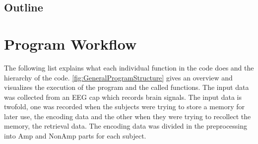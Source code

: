 \documentclass[12pt, a4paper]{article}
\begin{document}
\subsection{Outline}

\section{Program Workflow}

The following list explains what each individual function in the code does and the hierarchy of the code.
\cref{fig:GeneralProgramStructure} gives an overview and visualizes the execution of the program and the called functions.
The input data was collected from an EEG cap which records brain signals.
The input data is twofold, one was recorded when the subjects were trying to store a memory for later use, the encoding data and the other when they were trying to recollect the memory, the retrieval data.
The encoding data was divided in the preprocessing into Amp and NonAmp parts for each subject.%
\end{document}
